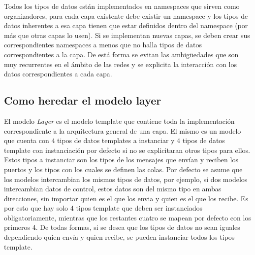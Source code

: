 \documentclass[10pt,a4paper]{article}
\begin{document}
Todos los tipos de datos están implementados en namespaces que sirven como organizadores, para cada capa existente debe existir un namespace y los tipos de datos inherentes a esa capa tienen que estar definidos dentro del namespace (por más que otras capas lo usen). Si se implementan nuevas capas, se deben crear sus correspondientes namespaces a menos que no halla tipos de datos correspondientes a la capa. De está forma se evitan las ambigüedades que son muy recurrentes en el ámbito de las redes y se explicita la interacción con los datos correspondientes a cada capa.

\subsection{Como heredar el modelo layer}

El modelo \textit{Layer} es el modelo template que contiene toda la implementación correspondiente a la arquitectura general de una capa. El mismo es un modelo que cuenta con $4$ tipos de datos templates a instanciar y $4$ tipos de datos template con instanciación por defecto si no se explicitaran otros tipos para ellos. Estos tipos a instanciar son los tipos de los mensajes que envían y reciben los puertos y los tipos con los cuales se definen las colas. Por defecto se asume que los modelos intercambian los mismos tipos de datos, por ejemplo, si dos modelos intercambian datos de control, estos datos son del mismo tipo en ambas direcciones, sin importar quien es el que los envia y quien es el que los recibe. Es por esto que hay solo 4 tipos template que deben ser instanciados obligatoriamente, mientras que los restantes cuatro se mapean por defecto con los primeros 4. De todas formas, si se desea que los tipos de datos no sean iguales dependiendo quien envía y quien recibe, se pueden instanciar todos los tipos template.\\
\end{document}
